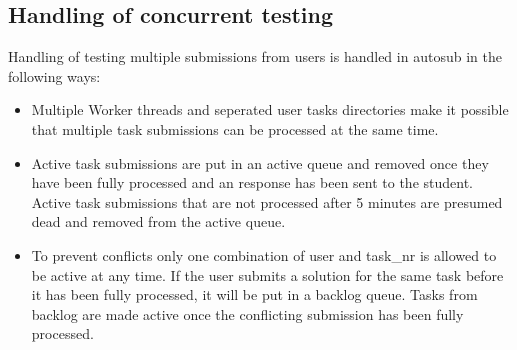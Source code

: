 \subsection{Handling of concurrent testing}
Handling of testing multiple submissions from users is handled in autosub in the following ways:
\begin{itemize}
\item Multiple Worker threads and seperated user tasks directories make it possible that
	multiple task submissions can be processed at the same time.
\item Active task submissions are put in an active queue and removed once they have been fully
	processed and an response has been sent to the student. Active task submissions that are
	not processed after 5 minutes are presumed dead and removed from the active queue.
\item To prevent conflicts only one combination of user and task\_nr is allowed to be active at any
	time. If the user submits a solution for the same task before it has been fully processed, it
	will be put in a backlog queue. Tasks from backlog are made active once the conflicting
	submission has been fully processed.
\end{itemize}
